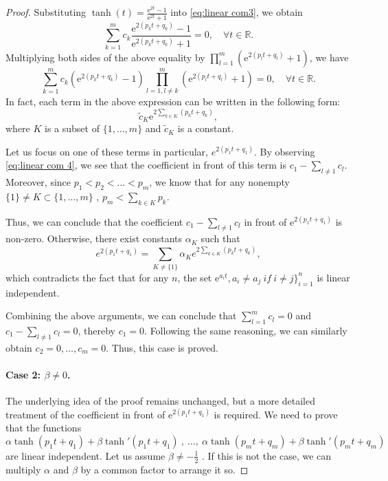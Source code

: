 \documentclass{article}
\begin{document}
\begin{proof}
Substituting $\tanh(t)=\frac{\mathrm{e}^{2t}-1}{\mathrm{e}^{2t}+1}$ into \cref{eq:linear com3}, we obtain 
\begin{equation*}
    \sum_{k=1}^{m} c_k \frac{\mathrm{e}^{2(p_k t + q_k)} - 1}{\mathrm{e}^{2(p_k t + q_k)} + 1} = 0, \quad \forall t \in \mathbb{R}.
\end{equation*}
Multiplying both sides of the above equality by $\prod_{l=1}^{m}(\mathrm{e}^{2(p_l t + q_l)} + 1)$, we have
\begin{equation}
    \sum_{k=1}^{m}c_k (\mathrm{e}^{2(p_k t + q_k)} - 1) \prod_{l=1, l \neq k}^{m} (\mathrm{e}^{2(p_l t + q_l)} + 1) = 0, \quad \forall t \in \mathbb{R}.\label{eq:linear com 4}
\end{equation}
In fact, each term in the above expression can be written in the following form:
\begin{equation*}
    \tilde{c}_{K}\mathrm{e}^{2\sum_{k\in K}(p_k t+q_k)} ,
\end{equation*}
where $K$ is a subset of $\{1,\ldots,m\}$ and $\tilde{c}_{K}$ is a constant.

Let us focus on one of these terms in particular, $e^{2(p_1 t+q_1)} $. By observing \cref{eq:linear com 4}, we see that the coefficient in front of this term is $c_{1}-\sum_{l\neq 1}c_{l}$.
Moreover, since \( p_1 < p_2 < \ldots < p_m \), we know that for any nonempty $\{1\}\neq K \subset \{1,\ldots,m\}$ , $p_{m}< \sum_{k\in K}p_k$.

Thus, we can conclude that the coefficient $c_{1}-\sum_{l\neq 1}c_{l}$ in front of $\mathrm{e}^{2(p_1 t+q_1)}$ is non-zero. Otherwise, there exist constants $\alpha_{K}$ such that
\begin{equation*}
    e^{2(p_1 t+q_1)} = \sum_{K\neq\{1\}} \alpha_{K} e^{2\sum_{k\in K}(p_k t+q_k)},
\end{equation*}
which contradicts the fact that for any $n$, the set $\mathrm{e}^{a_{i}t}, a_{i}\neq a_{j}\ if \ i\neq j\}_{i=1}^{n}$ is linear independent.

Combining the above arguments, we can conclude that $\sum_{l=1}^{m}c_{l}=0$ and $c_{1}-\sum_{l\neq 1}c_{l}=0$, thereby $c_{1}=0$. 
Following the same reasoning, we can similarly obtain \( c_2 = 0, \ldots, c_m = 0 \). Thus, this case is proved.

\paragraph{Case 2: $\beta\neq 0$.}The underlying idea of the proof remains unchanged, but a more detailed treatment of the coefficient in front of $\mathrm{e}^{2(p_1 t+q_1)}$ is required.
We need to prove that  the functions 
    \begin{equation*}
        \alpha \tanh(p_1 t + q_1)+\beta \tanh'(p_1 t + q_1)\ ,\ \ldots, \ \alpha \tanh(p_m t + q_m)+\beta \tanh'(p_m t + q_m)
    \end{equation*}
are linear independent. Let us assume $\beta \neq-\frac{1}{2}$ . If this is not the case, we can multiply $\alpha$ and $\beta$ by a common factor to arrange it so.


\end{proof}
\end{document}
